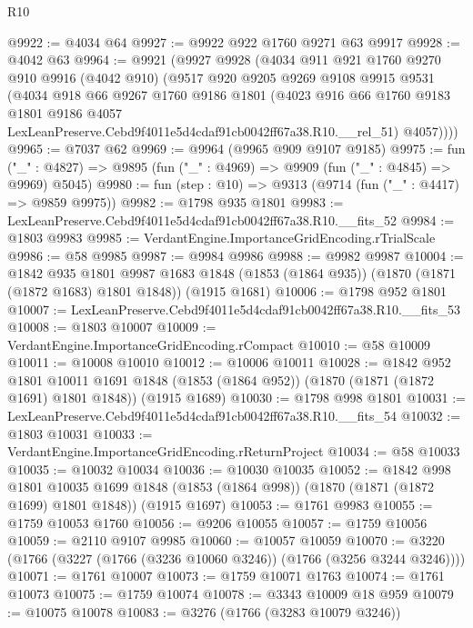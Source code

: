\begin{lexlean}{R10}
\begin{coremodule}
@9922 := @4034 @64
@9927 := @9922 @922 @1760 @9271 @63 @9917
@9928 := @4042 @63
@9964 := @9921
    (@9927
      @9928
      (@4034
        @911
        @921
        @1760
        @9270
        @910
        @9916
        (@4042 @910)
        (@9517
          @920
          @9205
          @9269
          @9108
          @9915
          @9531
          (@4034
            @918
            @66
            @9267
            @1760
            @9186
            @1801
            (@4023
              @916
              @66
              @1760
              @9183
              @1801
              @9186
              @4057
              LexLeanPreserve.Cebd9f4011e5d4cdaf91cb0042ff67a38.R10.__rel_51)
            @4057))))
@9965 := @7037 @62
@9969 := @9964 (@9965 @909 @9107 @9185)
@9975 := fun ("_" : @4827) => @9895 (fun ("_" : @4969) => @9909 (fun ("_" : @4845) => @9969) @5045)
@9980 := fun (step : @10) => @9313 (@9714 (fun ("_" : @4417) => @9859 @9975))
@9982 := @1798 @935 @1801
@9983 := LexLeanPreserve.Cebd9f4011e5d4cdaf91cb0042ff67a38.R10.__fits_52
@9984 := @1803 @9983
@9985 := VerdantEngine.ImportanceGridEncoding.rTrialScale
@9986 := @58 @9985
@9987 := @9984 @9986
@9988 := @9982 @9987
@10004 := @1842
    @935
    @1801
    @9987
    @1683
    @1848
    (@1853 (@1864 @935))
    (@1870 (@1871 (@1872 @1683) @1801 @1848))
    (@1915 @1681)
@10006 := @1798 @952 @1801
@10007 := LexLeanPreserve.Cebd9f4011e5d4cdaf91cb0042ff67a38.R10.__fits_53
@10008 := @1803 @10007
@10009 := VerdantEngine.ImportanceGridEncoding.rCompact
@10010 := @58 @10009
@10011 := @10008 @10010
@10012 := @10006 @10011
@10028 := @1842
    @952
    @1801
    @10011
    @1691
    @1848
    (@1853 (@1864 @952))
    (@1870 (@1871 (@1872 @1691) @1801 @1848))
    (@1915 @1689)
@10030 := @1798 @998 @1801
@10031 := LexLeanPreserve.Cebd9f4011e5d4cdaf91cb0042ff67a38.R10.__fits_54
@10032 := @1803 @10031
@10033 := VerdantEngine.ImportanceGridEncoding.rReturnProject
@10034 := @58 @10033
@10035 := @10032 @10034
@10036 := @10030 @10035
@10052 := @1842
    @998
    @1801
    @10035
    @1699
    @1848
    (@1853 (@1864 @998))
    (@1870 (@1871 (@1872 @1699) @1801 @1848))
    (@1915 @1697)
@10053 := @1761 @9983
@10055 := @1759 @10053 @1760
@10056 := @9206 @10055
@10057 := @1759 @10056
@10059 := @2110 @9107 @9985
@10060 := @10057 @10059
@10070 := @3220 (@1766 (@3227 (@1766 (@3236 @10060 @3246)) (@1766 (@3256 @3244 @3246))))
@10071 := @1761 @10007
@10073 := @1759 @10071 @1763
@10074 := @1761 @10073
@10075 := @1759 @10074
@10078 := @3343 @10009 @18 @959
@10079 := @10075 @10078
@10083 := @3276 (@1766 (@3283 @10079 @3246))

\end{coremodule}
\end{lexlean}
